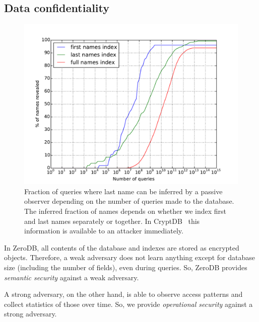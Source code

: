 \documentclass[notitlepage,longbibliography]{revtex4-1}
\begin{document}
\subsection{Data confidentiality}

\begin{figure}
	\begin{center}
        \includegraphics[width=0.7\columnwidth]{surname-attack.pdf}
	\end{center}
    \caption{
        Fraction of queries where last name can be inferred by a passive observer depending on the number of queries made to the database.
        The inferred fraction of names depends on whether we index first and last names separately or together.
        In CryptDB~\cite{cryptdb} this information is available to an attacker immediately.
    }
	\label{fig:surname-attack}
\end{figure}

In ZeroDB, all contents of the database and indexes are stored as encrypted objects.
Therefore, a weak adversary does not learn anything except for database size (including the number of fields), even during queries.
So, ZeroDB provides \emph{semantic security} against a weak adversary.

A strong adversary, on the other hand, is able to observe access patterns and collect statistics of those over time.
So, we provide \emph{operational security} against a strong adversary.
\end{document}
